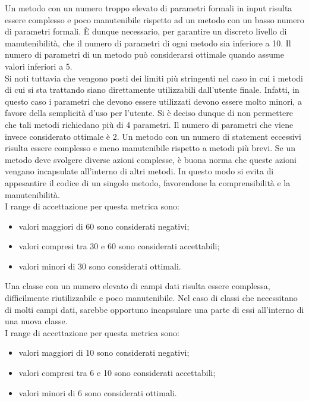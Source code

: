 			 \label{subsec:numParMet}
			Un metodo con un numero troppo elevato di parametri formali in input risulta essere complesso e poco manutenibile rispetto ad un metodo con un basso numero di parametri formali. È dunque necessario, per garantire un discreto livello di manutenibilità, che il numero di parametri di ogni metodo sia inferiore a 10. Il numero di parametri di un metodo può considerarsi ottimale quando assume valori inferiori a 5.\\
			Si noti tuttavia che vengono posti dei limiti più stringenti nel caso in cui i metodi di cui si sta trattando siano direttamente utilizzabili dall'utente finale. Infatti, in questo caso i parametri che devono essere utilizzati devono essere molto minori, a favore della semplicità d'uso per l'utente. Si è deciso dunque di non permettere che tali metodi richiedano più di 4 parametri. Il numero di parametri che viene invece considerato ottimale è 2.
			 \label{subsec:numStatement}
			Un metodo con un numero di statement eccessivi risulta essere complesso e meno manutenibile rispetto a metodi più brevi. Se un metodo deve svolgere diverse azioni complesse, è buona norma che queste azioni vengano incapsulate all'interno di altri metodi. In questo modo si evita di appesantire il codice di un singolo metodo, favorendone la comprensibilità e la manutenibilità.\\
			I range di accettazione per questa metrica sono:
				\begin{itemize}
					\item valori maggiori di 60 sono considerati negativi;
					\item valori compresi tra 30 e 60 sono considerati accettabili;
					\item valori minori di 30 sono considerati ottimali.
				\end{itemize}
			 \label{subsec:numFields}
			Una classe con un numero elevato di campi dati risulta essere complessa, difficilmente riutilizzabile e poco manutenibile. Nel caso di classi che necessitano di molti campi dati, sarebbe opportuno incapsulare una parte di essi all'interno di una nuova classe.\\
			I range di accettazione per questa metrica sono:
				\begin{itemize}
					\item valori maggiori di 10 sono considerati negativi;
					\item valori compresi tra 6 e 10 sono considerati accettabili;
					\item valori minori di 6 sono considerati ottimali.
				\end{itemize}
